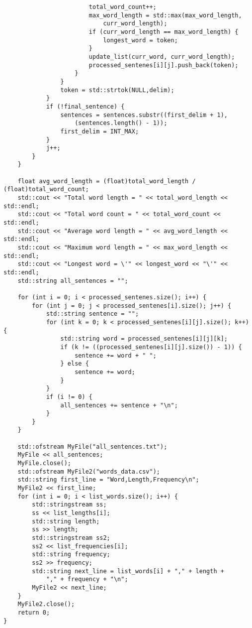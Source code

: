 \documentclass[a4paper,11pt]{article}
\begin{document}
\begin{appendices}
\begin{verbatim}
                        total_word_count++;
                        max_word_length = std::max(max_word_length,
                            curr_word_length);
                        if (curr_word_length == max_word_length) {
                            longest_word = token;
                        }
                        update_list(curr_word, curr_word_length);
                        processed_sentenes[i][j].push_back(token);
                    }
                }
                token = std::strtok(NULL,delim);
            }
            if (!final_sentence) {
                sentences = sentences.substr((first_delim + 1),
                    (sentences.length() - 1));
                first_delim = INT_MAX;
            }
            j++;
        }
    }

    float avg_word_length = (float)total_word_length / (float)total_word_count;
    std::cout << "Total word length = " << total_word_length << std::endl;
    std::cout << "Total word count = " << total_word_count << std::endl;
    std::cout << "Average word length = " << avg_word_length << std::endl;
    std::cout << "Maximum word length = " << max_word_length << std::endl;
    std::cout << "Longest word = \'" << longest_word << "\'" << std::endl;
    std::string all_sentences = "";

    for (int i = 0; i < processed_sentenes.size(); i++) {
        for (int j = 0; j < processed_sentenes[i].size(); j++) {
            std::string sentence = "";
            for (int k = 0; k < processed_sentenes[i][j].size(); k++) {
                std::string word = processed_sentenes[i][j][k];
                if (k != ((processed_sentenes[i][j].size()) - 1)) {
                    sentence += word + " ";
                } else {
                    sentence += word;
                }
            }
            if (i != 0) {
                all_sentences += sentence + "\n";
            }
        }
    }

    std::ofstream MyFile("all_sentences.txt");
    MyFile << all_sentences;
    MyFile.close();
    std::ofstream MyFile2("words_data.csv");
    std::string first_line = "Word,Length,Frequency\n";
    MyFile2 << first_line;
    for (int i = 0; i < list_words.size(); i++) {
        std::stringstream ss;
        ss << list_lengths[i];
        std::string length;
        ss >> length;
        std::stringstream ss2;
        ss2 << list_frequencies[i];
        std::string frequency;
        ss2 >> frequency;
        std::string next_line = list_words[i] + "," + length +
            "," + frequency + "\n";
        MyFile2 << next_line;
    }
    MyFile2.close();
    return 0;
}


\end{verbatim}
\end{appendices}
\end{document}
